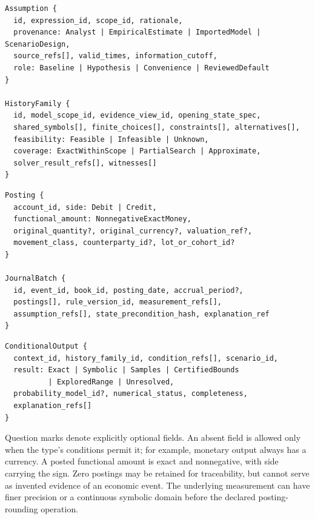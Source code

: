 \begin{minipage}{\linewidth}
\begin{lstlisting}
Assumption {
  id, expression_id, scope_id, rationale,
  provenance: Analyst | EmpiricalEstimate | ImportedModel | ScenarioDesign,
  source_refs[], valid_times, information_cutoff,
  role: Baseline | Hypothesis | Convenience | ReviewedDefault
}

HistoryFamily {
  id, model_scope_id, evidence_view_id, opening_state_spec,
  shared_symbols[], finite_choices[], constraints[], alternatives[],
  feasibility: Feasible | Infeasible | Unknown,
  coverage: ExactWithinScope | PartialSearch | Approximate,
  solver_result_refs[], witnesses[]
}
\end{lstlisting}
\end{minipage}

\begin{minipage}{\linewidth}
\begin{lstlisting}
Posting {
  account_id, side: Debit | Credit,
  functional_amount: NonnegativeExactMoney,
  original_quantity?, original_currency?, valuation_ref?,
  movement_class, counterparty_id?, lot_or_cohort_id?
}

JournalBatch {
  id, event_id, book_id, posting_date, accrual_period?,
  postings[], rule_version_id, measurement_refs[],
  assumption_refs[], state_precondition_hash, explanation_ref
}
\end{lstlisting}
\end{minipage}

\begin{minipage}{\linewidth}
\begin{lstlisting}
ConditionalOutput {
  context_id, history_family_id, condition_refs[], scenario_id,
  result: Exact | Symbolic | Samples | CertifiedBounds
          | ExploredRange | Unresolved,
  probability_model_id?, numerical_status, completeness,
  explanation_refs[]
}
\end{lstlisting}
\end{minipage}

Question marks denote explicitly optional fields. An absent field is allowed
only when the type's conditions permit it; for example, monetary output always
has a currency. A posted functional amount is exact and nonnegative, with side
carrying the sign. Zero postings may be retained for traceability, but cannot
serve as invented evidence of an economic event. The underlying measurement
can have finer precision or a continuous symbolic domain before the declared
posting-rounding operation.

